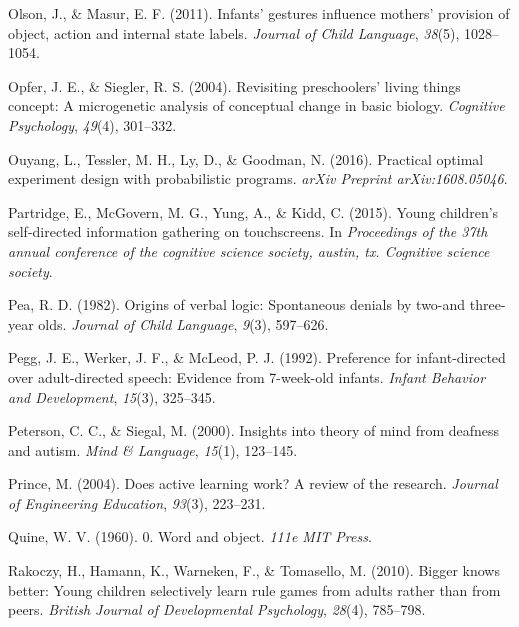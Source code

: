 \documentclass[oneside]{report}
\begin{document}
\leavevmode\hypertarget{ref-olson2011infants}{}%
Olson, J., \& Masur, E. F. (2011). Infants' gestures influence mothers'
provision of object, action and internal state labels. \emph{Journal of
Child Language}, \emph{38}(5), 1028--1054.

\leavevmode\hypertarget{ref-opfer2004revisiting}{}%
Opfer, J. E., \& Siegler, R. S. (2004). Revisiting preschoolers' living
things concept: A microgenetic analysis of conceptual change in basic
biology. \emph{Cognitive Psychology}, \emph{49}(4), 301--332.

\leavevmode\hypertarget{ref-ouyang2016practical}{}%
Ouyang, L., Tessler, M. H., Ly, D., \& Goodman, N. (2016). Practical
optimal experiment design with probabilistic programs. \emph{arXiv
Preprint arXiv:1608.05046}.

\leavevmode\hypertarget{ref-partridge2015young}{}%
Partridge, E., McGovern, M. G., Yung, A., \& Kidd, C. (2015). Young
children's self-directed information gathering on touchscreens. In
\emph{Proceedings of the 37th annual conference of the cognitive science
society, austin, tx. Cognitive science society}.

\leavevmode\hypertarget{ref-pea1982origins}{}%
Pea, R. D. (1982). Origins of verbal logic: Spontaneous denials by
two-and three-year olds. \emph{Journal of Child Language}, \emph{9}(3),
597--626.

\leavevmode\hypertarget{ref-pegg1992preference}{}%
Pegg, J. E., Werker, J. F., \& McLeod, P. J. (1992). Preference for
infant-directed over adult-directed speech: Evidence from 7-week-old
infants. \emph{Infant Behavior and Development}, \emph{15}(3), 325--345.

\leavevmode\hypertarget{ref-peterson2000insights}{}%
Peterson, C. C., \& Siegal, M. (2000). Insights into theory of mind from
deafness and autism. \emph{Mind \& Language}, \emph{15}(1), 123--145.

\leavevmode\hypertarget{ref-prince2004does}{}%
Prince, M. (2004). Does active learning work? A review of the research.
\emph{Journal of Engineering Education}, \emph{93}(3), 223--231.

\leavevmode\hypertarget{ref-quine19600}{}%
Quine, W. V. (1960). 0. Word and object. \emph{111e MIT Press}.

\leavevmode\hypertarget{ref-rakoczy2010bigger}{}%
Rakoczy, H., Hamann, K., Warneken, F., \& Tomasello, M. (2010). Bigger
knows better: Young children selectively learn rule games from adults
rather than from peers. \emph{British Journal of Developmental
Psychology}, \emph{28}(4), 785--798.
\end{document}
